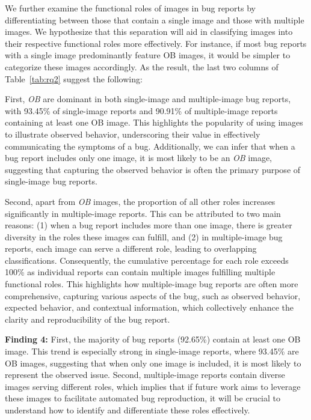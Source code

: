 We further examine the functional roles of images in bug reports by differentiating between those that contain a single image and those with multiple images.  We hypothesize that this separation will aid in classifying images into their respective functional roles more effectively. For instance, if most bug reports with a single image predominantly feature OB images, it would be simpler to categorize these images accordingly. As the result, the last two columns of Table~\ref{tab:rq2} suggest the following:

First, \textit{OB} are dominant in both single-image and multiple-image bug reports, with 93.45\% of single-image reports and 90.91\% of multiple-image reports containing at least one OB image. This highlights the popularity of using images to illustrate observed behavior, underscoring their value in effectively communicating the symptoms of a bug. Additionally, we can infer that when a bug report includes only one image, it is most likely to be an \textit{OB} image, suggesting that capturing the observed behavior is often the primary purpose of single-image bug reports.

Second, apart from \textit{OB} images, the proportion of all other roles increases significantly in multiple-image reports. This can be attributed to two main reasons: (1) when a bug report includes more than one image, there is greater diversity in the roles these images can fulfill, and (2) in multiple-image bug reports, each image can serve a different role, leading to overlapping classifications. Consequently, the cumulative percentage for each role exceeds 100\% as individual reports can contain multiple images fulfilling multiple functional roles. This highlights how multiple-image bug reports are often more comprehensive, capturing various aspects of the bug, such as observed behavior, expected behavior, and contextual information, which collectively enhance the clarity and reproducibility of the bug report.



\begin{tcolorbox}[colback=blue!5, colframe=black, boxrule=0.5pt]
\textbf{Finding 4:} 
%
First, the majority of bug reports (92.65\%) contain at least one OB image. This trend is especially strong in single-image reports, where 93.45\% are OB images, suggesting that when only one image is included, it is most likely to represent the observed issue. 
%
Second, multiple-image reports contain diverse images serving different roles, which implies that if future work aims to leverage these images to facilitate automated bug reproduction, it will be crucial to understand how to identify and differentiate these roles effectively.
\end{tcolorbox}








